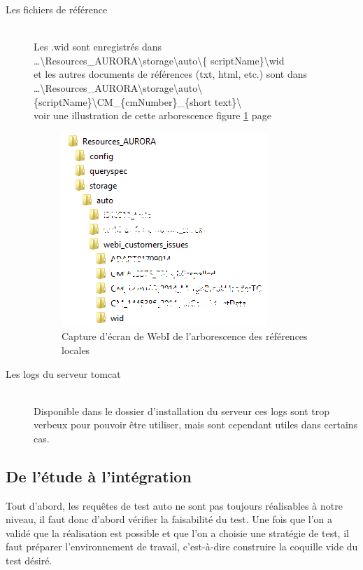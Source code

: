 \begin{description}
\item[Les fichiers de référence] \hfill \\
Les .wid sont enregistrés dans \\ \ldots\textbackslash{}Resources\_AURORA\textbackslash{}storage\textbackslash{}auto\textbackslash{}\{ scriptName\}\textbackslash{}wid\\
et les autres documents de références (txt, html, etc.) sont dans \\ \ldots\textbackslash{}Resources\_AURORA\textbackslash{}storage\textbackslash{}auto\textbackslash{}\{scriptName\}\textbackslash{}CM\_\{cmNumber\}\_\{short text\}\textbackslash{}\\ 
voir une illustration de cette arborescence figure \ref{figure:localSavedReferences} page \pageref{figure:localSavedReferences}
\begin{figure}[!h]
  \centering
      \includegraphics{images/localSavedReferences.png}
  \caption{Capture d'écran de WebI de l'arborescence des références locales}
	\label{figure:localSavedReferences}
\end{figure}
\item[Les logs du serveur tomcat] \hfill \\
Disponible dans le dossier d'installation du serveur ces logs sont trop verbeux pour pouvoir \^{e}tre utiliser, mais sont cependant utiles dans certains cas.
\end{description}





\subsection{De l'\'{e}tude à l'intégration}

Tout d'abord, les requ\^{e}tes de test auto ne sont pas toujours réalisables à notre niveau, il faut donc d'abord vérifier la faisabilité du test. Une fois que l'on a validé que la réalisation est possible et que l'on a choisie une stratégie de test, il faut préparer l'environnement de travail, c'est-à-dire construire la coquille vide du test désiré.


